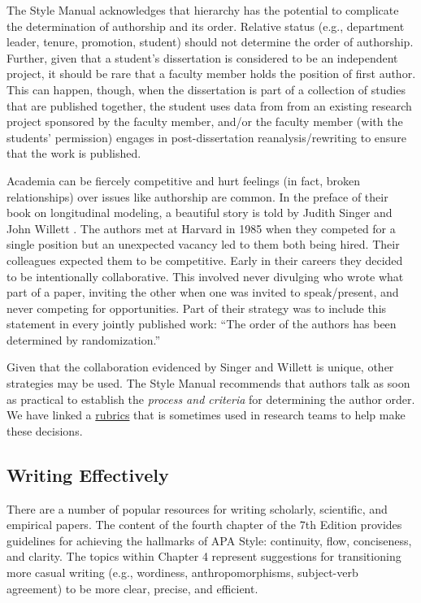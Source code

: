 \documentclass[
  11pt,
]{book}
\begin{document}
The Style Manual acknowledges that hierarchy has the potential to complicate the determination of authorship and its order. Relative status (e.g., department leader, tenure, promotion, student) should not determine the order of authorship. Further, given that a student's dissertation is considered to be an independent project, it should be rare that a faculty member holds the position of first author. This can happen, though, when the dissertation is part of a collection of studies that are published together, the student uses data from from an existing research project sponsored by the faculty member, and/or the faculty member (with the students' permission) engages in post-dissertation reanalysis/rewriting to ensure that the work is published.

Academia can be fiercely competitive and hurt feelings (in fact, broken relationships) over issues like authorship are common. In the preface of their book on longitudinal modeling, a beautiful story is told by Judith Singer and John Willett \citeyearpar{singer_applied_2003}. The authors met at Harvard in 1985 when they competed for a single position but an unexpected vacancy led to them both being hired. Their colleagues expected them to be competitive. Early in their careers they decided to be intentionally collaborative. This involved never divulging who wrote what part of a paper, inviting the other when one was invited to speak/present, and never competing for opportunities. Part of their strategy was to include this statement in every jointly published work: ``The order of the authors has been determined by randomization.''

Given that the collaboration evidenced by Singer and Willett \citeyearpar{singer_applied_2003} is unique, other strategies may be used. The Style Manual recommends that authors talk as soon as practical to establish the \emph{process and criteria} for determining the author order. We have linked a \href{https://github.com/lhbikos/TransformingResearchMethods/blob/main/Authorship\%20Rubric220721.xlsx}{rubrics} that is sometimes used in research teams to help make these decisions.

\hypertarget{writing-effectively}{%
\subsection{Writing Effectively}\label{writing-effectively}}

There are a number of popular resources for writing scholarly, scientific, and empirical papers. The content of the fourth chapter of the 7th Edition provides guidelines for achieving the hallmarks of APA Style: continuity, flow, conciseness, and clarity. The topics within Chapter 4 represent suggestions for transitioning more casual writing (e.g., wordiness, anthropomorphisms, subject-verb agreement) to be more clear, precise, and efficient.
\end{document}
